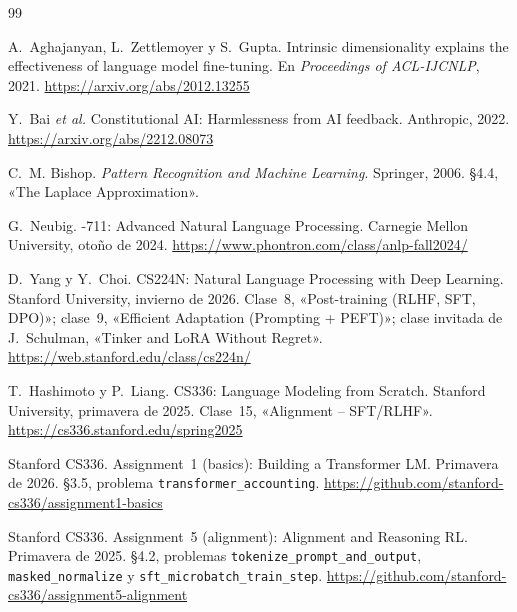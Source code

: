 \begin{thebibliography}{99}
\small

A.~Aghajanyan, L.~Zettlemoyer y S.~Gupta.
\newblock Intrinsic dimensionality explains the effectiveness of language model fine-tuning.
\newblock En \emph{Proceedings of ACL-IJCNLP}, 2021.
\newblock \url{https://arxiv.org/abs/2012.13255}

Y.~Bai \emph{et al.}
\newblock Constitutional AI: Harmlessness from AI feedback.
\newblock Anthropic, 2022.
\newblock \url{https://arxiv.org/abs/2212.08073}

C.~M. Bishop.
\newblock \emph{Pattern Recognition and Machine Learning}.
\newblock Springer, 2006.
\newblock §4.4, «The Laplace Approximation».

G.~Neubig.
-711: Advanced Natural Language Processing.
\newblock Carnegie Mellon University, otoño de 2024.
\newblock \url{https://www.phontron.com/class/anlp-fall2024/}

D.~Yang y Y.~Choi.
\newblock CS224N: Natural Language Processing with Deep Learning.
\newblock Stanford University, invierno de 2026. Clase~8, «Post-training (RLHF, SFT, DPO)»; clase~9, «Efficient Adaptation (Prompting + PEFT)»; clase invitada de J.~Schulman, «Tinker and LoRA Without Regret».
\newblock \url{https://web.stanford.edu/class/cs224n/}

T.~Hashimoto y P.~Liang.
\newblock CS336: Language Modeling from Scratch.
\newblock Stanford University, primavera de 2025. Clase~15, «Alignment -- SFT/RLHF».
\newblock \url{https://cs336.stanford.edu/spring2025}

Stanford CS336.
\newblock Assignment~1 (basics): Building a Transformer LM.
\newblock Primavera de 2026. §3.5, problema \texttt{transformer\_\allowbreak accounting}.
\newblock \url{https://github.com/stanford-cs336/assignment1-basics}

Stanford CS336.
\newblock Assignment~5 (alignment): Alignment and Reasoning RL.
\newblock Primavera de 2025. §4.2, problemas \texttt{tokenize\_\allowbreak prompt\_\allowbreak and\_\allowbreak output}, \texttt{masked\_\allowbreak normalize} y \texttt{sft\_\allowbreak microbatch\_\allowbreak train\_\allowbreak step}.
\newblock \url{https://github.com/stanford-cs336/assignment5-alignment}


\end{thebibliography}
